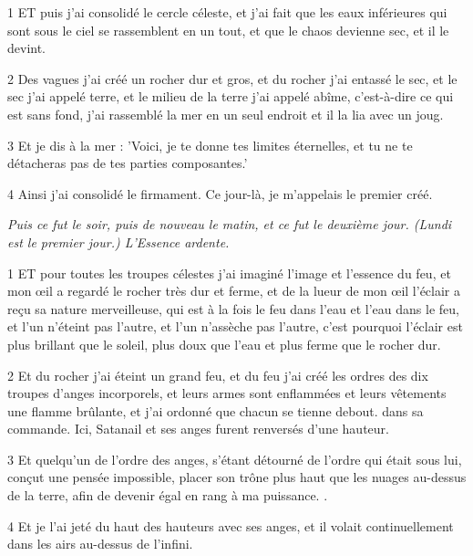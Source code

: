 \par 1 ET puis j'ai consolidé le cercle céleste, et j'ai fait que les eaux inférieures qui sont sous le ciel se rassemblent en un tout, et que le chaos devienne sec, et il le devint.

\par 2 Des vagues j'ai créé un rocher dur et gros, et du rocher j'ai entassé le sec, et le sec j'ai appelé terre, et le milieu de la terre j'ai appelé abîme, c'est-à-dire ce qui est sans fond, j'ai rassemblé la mer en un seul endroit et il la lia avec un joug.

\par 3 Et je dis à la mer : 'Voici, je te donne tes limites éternelles, et tu ne te détacheras pas de tes parties composantes.'

\par 4 Ainsi j'ai consolidé le firmament. Ce jour-là, je m'appelais le premier créé.


\par \textit{Puis ce fut le soir, puis de nouveau le matin, et ce fut le deuxième jour. (Lundi est le premier jour.) L'Essence ardente.}

\par 1 ET pour toutes les troupes célestes j'ai imaginé l'image et l'essence du feu, et mon œil a regardé le rocher très dur et ferme, et de la lueur de mon œil l'éclair a reçu sa nature merveilleuse, qui est à la fois le feu dans l'eau et l'eau dans le feu, et l'un n'éteint pas l'autre, et l'un n'assèche pas l'autre, c'est pourquoi l'éclair est plus brillant que le soleil, plus doux que l'eau et plus ferme que le rocher dur.

\par 2 Et du rocher j'ai éteint un grand feu, et du feu j'ai créé les ordres des dix troupes d'anges incorporels, et leurs armes sont enflammées et leurs vêtements une flamme brûlante, et j'ai ordonné que chacun se tienne debout. dans sa commande. Ici, Satanail et ses anges furent renversés d'une hauteur.

\par 3 Et quelqu'un de l'ordre des anges, s'étant détourné de l'ordre qui était sous lui, conçut une pensée impossible, placer son trône plus haut que les nuages ​​​​au-dessus de la terre, afin de devenir égal en rang à ma puissance. .

\par 4 Et je l'ai jeté du haut des hauteurs avec ses anges, et il volait continuellement dans les airs au-dessus de l'infini.

